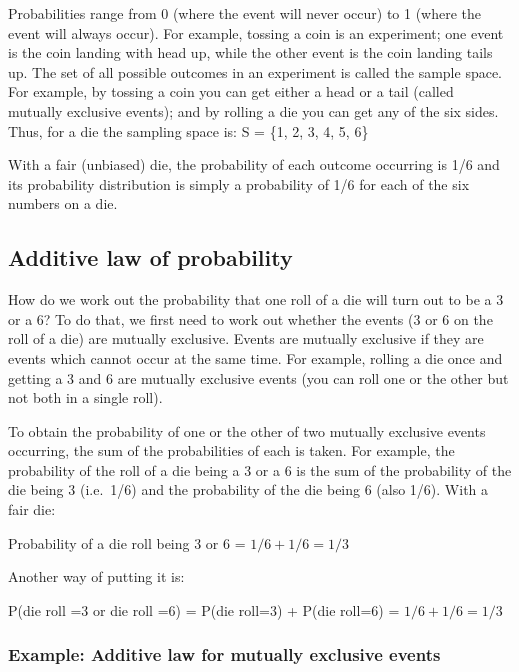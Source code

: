 \documentclass[
]{memoir}
\begin{document}
Probabilities range from 0 (where the event will never occur) to 1 (where the event will always occur). For example, tossing a coin is an experiment; one event is the coin landing with head up, while the other event is the coin landing tails up. The set of all possible outcomes in an experiment is called the sample space. For example, by tossing a coin you can get either a head or a tail (called mutually exclusive events); and by rolling a die you can get any of the six sides. Thus, for a die the sampling space is: S = \{1, 2, 3, 4, 5, 6\}

With a fair (unbiased) die, the probability of each outcome occurring is 1/6 and its probability distribution is simply a probability of 1/6 for each of the six numbers on a die.

\hypertarget{additive-law-of-probability}{%
\subsection{Additive law of probability}\label{additive-law-of-probability}}

How do we work out the probability that one roll of a die will turn out to be a 3 or a 6? To do that, we first need to work out whether the events (3 or 6 on the roll of a die) are mutually exclusive. Events are mutually exclusive if they are events which cannot occur at the same time. For example, rolling a die once and getting a 3 and 6 are mutually exclusive events (you can roll one or the other but not both in a single roll).

To obtain the probability of one or the other of two mutually exclusive events occurring, the sum of the probabilities of each is taken. For example, the probability of the roll of a die being a 3 or a 6 is the sum of the probability of the die being 3 (i.e.~1/6) and the probability of the die being 6 (also 1/6). With a fair die:

Probability of a die roll being 3 or 6 = \(1/6 + 1/6 = 1/3\)

Another way of putting it is:

P(die roll =3 or die roll =6) = P(die roll=3) + P(die roll=6) = \(1/6 + 1/6 = 1/3\)

\hypertarget{example-additive-law-for-mutually-exclusive-events}{%
\subsubsection{Example: Additive law for mutually exclusive events}\label{example-additive-law-for-mutually-exclusive-events}}
\end{document}
